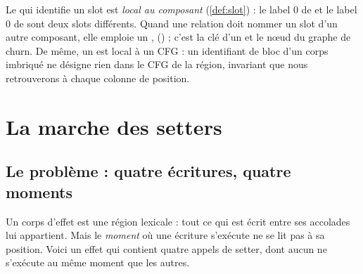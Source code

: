 Le  qui identifie un slot est \emph{local au composant} (\cref{def:slot}) : le label 0 de  et le label 0 de  sont deux slots différents. Quand une relation doit nommer un slot d'un autre composant, elle emploie un ,  () ; c'est la clé d'un  et le nœud du graphe de churn. De même, un  est local à un CFG : un identifiant de bloc d'un corps imbriqué ne désigne rien dans le CFG de la région, invariant que nous retrouverons à chaque colonne de position.

\section{La marche des setters}
\label{sec:relations-marche}
\subsection{Le problème : quatre écritures, quatre moments}

Un corps d'effet est une région lexicale : tout ce qui est écrit entre ses accolades lui appartient. Mais le \emph{moment} où une écriture s'exécute ne se lit pas à sa position. Voici un effet qui contient quatre appels de setter, dont aucun ne s'exécute au même moment que les autres.

